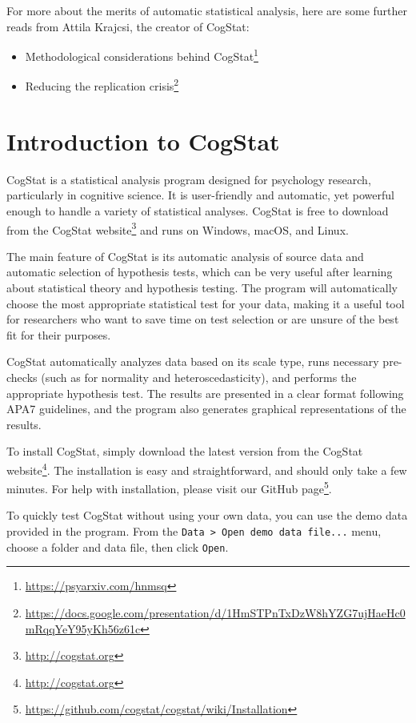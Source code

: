 \documentclass[
  11pt,
  a4paper,
  twoside,symmetric,openright]{book}
\providecommand{\tightlist}{%
  \setlength{\itemsep}{0pt}\setlength{\parskip}{0pt}}
\theoremstyle{break}
\theoremstyle{break}
\DeclareRobustCommand{\href}[2]{#2\footnote{\url{#1}}}
\begin{document}
For more about the merits of automatic statistical analysis, here are some further reads from Attila Krajcsi, the creator of CogStat:

\begin{itemize}
\tightlist
\item
  \href{https://psyarxiv.com/hnmsq}{Methodological considerations behind CogStat}
\item
  \href{https://docs.google.com/presentation/d/1HmSTPnTxDzW8hYZG7ujHaeHc0mRqqYeY95yKh56z61c}{Reducing the replication crisis}
\end{itemize}

\chapter{Introduction to CogStat}\label{cogstatintro}

CogStat is a statistical analysis program designed for psychology research, particularly in cognitive science. It is user-friendly and automatic, yet powerful enough to handle a variety of statistical analyses. CogStat is free to download from the \href{http://cogstat.org}{CogStat website} and runs on Windows, macOS, and Linux.

The main feature of CogStat is its automatic analysis of source data and automatic selection of hypothesis tests, which can be very useful after learning about statistical theory and hypothesis testing. The program will automatically choose the most appropriate statistical test for your data, making it a useful tool for researchers who want to save time on test selection or are unsure of the best fit for their purposes.

CogStat automatically analyzes data based on its scale type, runs necessary pre-checks (such as for normality and heteroscedasticity), and performs the appropriate hypothesis test. The results are presented in a clear format following APA7 guidelines, and the program also generates graphical representations of the results.

To install CogStat, simply download the latest version from the \href{http://cogstat.org}{CogStat website}. The installation is easy and straightforward, and should only take a few minutes. For help with installation, please visit our \href{https://github.com/cogstat/cogstat/wiki/Installation}{GitHub page}.

To quickly test CogStat without using your own data, you can use the demo data provided in the program. From the \texttt{Data\ \textgreater{}\ Open\ demo\ data\ file...} menu, choose a folder and data file, then click \texttt{Open}.
\end{document}
